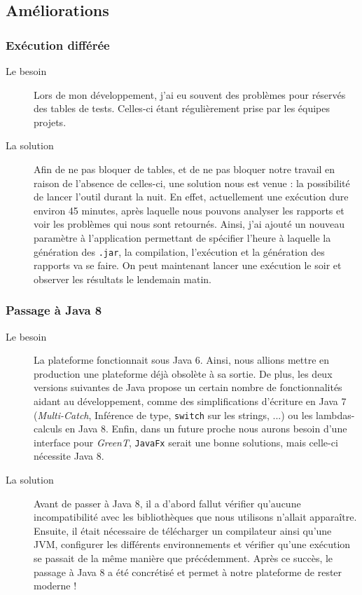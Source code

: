 \subsection{Améliorations}
	\subsubsection{Exécution différée} %
	\begin{description}
		\item[Le besoin] Lors de mon développement, j'ai eu souvent des problèmes pour réservés des tables de tests. Celles-ci étant régulièrement prise par les équipes projets. 
		\item[La solution] Afin de ne pas bloquer de tables, et de ne pas bloquer notre travail en raison de l'absence de celles-ci, une solution nous est venue : la possibilité de lancer l'outil durant la nuit. En effet, actuellement une exécution dure environ 45 minutes, après laquelle nous pouvons analyser les rapports et voir les problèmes qui nous sont retournés. Ainsi, j'ai ajouté un nouveau paramètre à l'application permettant de spécifier l'heure à laquelle la génération des \texttt{.jar}, la compilation, l'exécution et la génération des rapports va se faire. On peut maintenant lancer une exécution le soir et observer les résultats le lendemain matin.
	\end{description}
	
	\subsubsection{Passage à Java 8}
		\begin{description}
			\item[Le besoin] La plateforme fonctionnait sous Java 6. Ainsi, nous allions mettre en production une plateforme déjà obsolète à sa sortie. De plus, les deux versions suivantes de Java propose un certain nombre de fonctionnalités aidant au développement, comme des simplifications d'écriture en Java 7 (\textit{Multi-Catch}, Inférence de type, \texttt{switch} sur les strings, ...) ou les lambdas-calculs en Java 8. Enfin, dans un future proche nous aurons besoin d'une interface pour \textit{GreenT}, \texttt{JavaFx} serait une bonne solutions, mais celle-ci nécessite Java 8.
			\item[La solution] Avant de passer à Java 8, il a d'abord fallut vérifier qu'aucune incompatibilité avec les bibliothèques que nous utilisons n'allait apparaître. Ensuite, il était nécessaire de télécharger un compilateur ainsi qu'une JVM, configurer les différents environnements et vérifier qu'une exécution se passait de la même manière que précédemment. Après ce succès, le passage à Java 8 a été concrétisé et permet à notre plateforme de rester moderne ! 
		\end{description}
		
